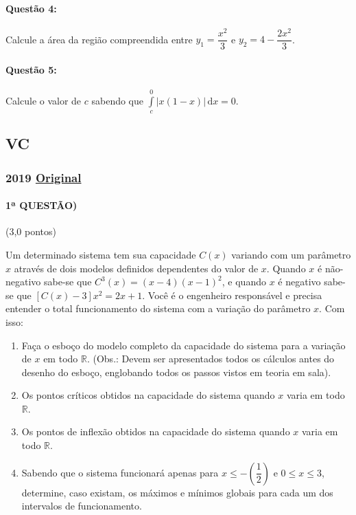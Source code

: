 \documentclass[12pt,a4paper]{article}
\newcommand{\dd}{\mathrm{d}}
\newcommand{\original}[1]{\tiny \href{#1}{Original} \normalsize}
\begin{document}
\vspace{1.5cm}

\paragraph{Questão 4:}

Calcule a área da região compreendida entre $y_{1}=\dfrac{x^{2}}{3}$ e $y_{2}=4-\dfrac{2x^2}{3}$.

\vspace{1.5cm}

\paragraph{Questão 5:}

Calcule o valor de $c$ sabendo que $\displaystyle\int\limits_{c}^{0}\left \vert x(1-x) \right \vert\,\dd x=0$.


\newpage


\subsection{VC}

\subsubsection{2019 \original{}}

\paragraph{1ª QUESTÃO)} (3,0 pontos)

Um determinado sistema tem sua capacidade $C(x)$ variando com um parâmetro $x$ através de dois modelos definidos dependentes do valor de $x$. Quando $x$ é não-negativo sabe-se que $C^3(x) = (x-4)(x-1)^2$, e quando $x$ é negativo sabe-se que $[C(x) - 3 ]x^2 = 2x+1$. Você é o engenheiro responsável e precisa entender o total funcionamento do sistema com a variação do parâmetro $x$. Com isso:
\begin{enumerate}[label = (\alph*)]
    \item Faça o esboço do modelo completo da capacidade do sistema para a variação de $x$ em todo $\mathbb{R}$. (Obs.: Devem ser apresentados todos os cálculos antes do desenho do esboço, englobando todos os passos vistos em teoria em sala).
    \item Os pontos críticos obtidos na capacidade do sistema quando $x$ varia em todo $\mathbb{R}$.
    \item Os pontos de inflexão obtidos na capacidade do sistema quando $x$ varia em todo $\mathbb{R}$.
    \item Sabendo que o sistema funcionará apenas para $x \leq - \left(\dfrac{1}{2}\right)$ e $0 \leq  x \leq 3$, determine, caso existam, os máximos e mínimos globais para cada um dos intervalos de funcionamento.
\end{enumerate}
\end{document}
